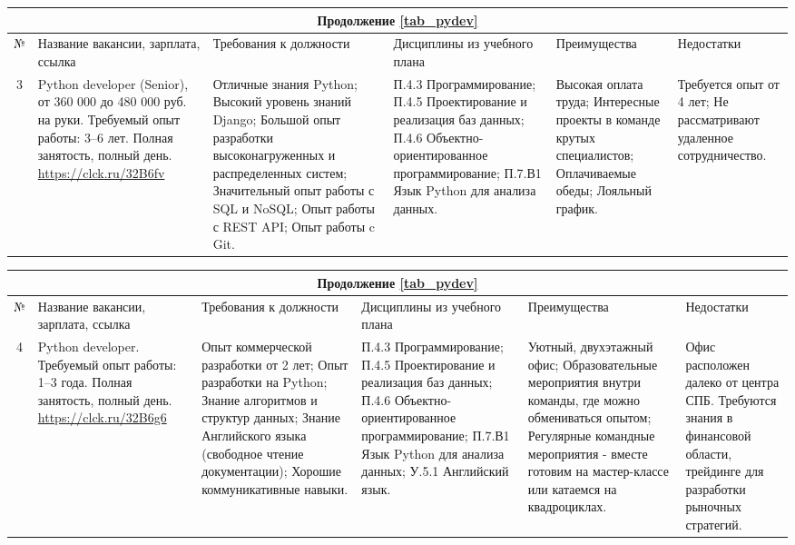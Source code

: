 \documentclass[14pt]{extreport}
\begin{document}
\begin{landscape}
\begin{table}[H]
	\begin{tabular}{|c|p{3.3cm}|p{6cm}|p{4.7cm}|p{5.5cm}|p{3.5cm}|}
	\multicolumn{6}{c}{Продолжение \ref{tab_pydev}} \\
	\hline № & {Название вакансии, зарплата, ссылка} & {Требования к должности} & {Дисциплины из учебного плана} & {Преимущества} & {Недостатки} \\
 	\hline 3 & {Python developer (Senior),
от 360 000 до 480 000 руб. на руки.
Требуемый опыт работы: 3–6 лет.
Полная занятость, полный день. \url{https://clck.ru/32B6fv}} & {Отличные знания Python;
Высокий уровень знаний Django; Большой опыт разработки высоконагруженных и распределенных систем;
Значительный опыт работы с SQL и NoSQL;
Опыт работы с REST API;
Опыт работы c Git.} & {П.4.3 Программирование;
П.4.5 Проектирование и реализация баз данных;
П.4.6 Объектно-ориентированное программирование;
П.7.В1 Язык Python для анализа данных.} & {Высокая оплата труда;
Интересные проекты в команде крутых специалистов;
Оплачиваемые обеды;
Лояльный график.} & {Требуется опыт от 4 лет;
Не рассматривают удаленное сотрудничество.} \\
	\hline
	\end{tabular}
\end{table}

\begin{table}[H]
	\begin{tabular}{|c|p{3.3cm}|p{6cm}|p{4.7cm}|p{5.5cm}|p{3.5cm}|}
	\multicolumn{6}{c}{Продолжение \ref{tab_pydev}} \\
	\hline № & {Название вакансии, зарплата, ссылка} & {Требования к должности} & {Дисциплины из учебного плана} & {Преимущества} & {Недостатки} \\
 	\hline 4 & {Python developer. Требуемый опыт работы: 1–3 года.
Полная занятость, полный день. \url{https://clck.ru/32B6g6}} & {Опыт коммерческой разработки от 2 лет;
Опыт разработки на Python;
Знание алгоритмов и структур данных;
Знание Английского языка (свободное чтение документации);
Хорошие коммуникативные навыки.} & {П.4.3 Программирование;
П.4.5 Проектирование и реализация баз данных;
П.4.6 Объектно-ориентированное программирование;
П.7.В1 Язык Python для анализа данных;
У.5.1 Английский язык.} & {Уютный, двухэтажный офис;
Образовательные мероприятия внутри команды, где можно обмениваться опытом;
Регулярные командные мероприятия - вместе готовим на мастер-классе или катаемся на квадроциклах.} & {Офис расположен далеко от центра СПБ.
Требуются знания в финансовой области, трейдинге для разработки рыночных стратегий.} \\
	\hline
	\end{tabular}
\end{table}


\end{landscape}
\end{document}
